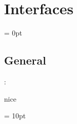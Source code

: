 
\section{Interfaces} 


\parskip = 0pt

\vspace{3mm} \subsection*{General}

: 

nice
\vspace{2mm}

\vspace{5mm}\parskip = 10pt 
